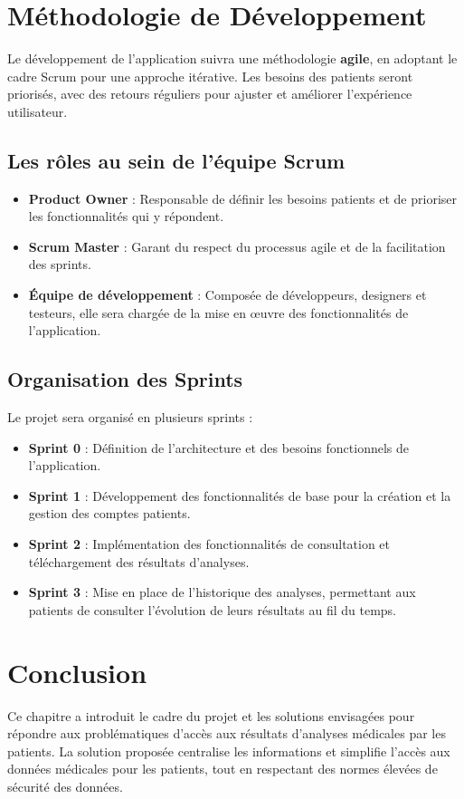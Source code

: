 \documentclass[12pt,a4paper]{report}
\begin{document}
\section{Méthodologie de Développement}
Le développement de l'application suivra une méthodologie \textbf{agile}, en adoptant le cadre Scrum pour une approche itérative. Les besoins des patients seront priorisés, avec des retours réguliers pour ajuster et améliorer l'expérience utilisateur.

\subsection{Les rôles au sein de l'équipe Scrum}
\begin{itemize}
    \item \textbf{Product Owner} : Responsable de définir les besoins patients et de prioriser les fonctionnalités qui y répondent.
    \item \textbf{Scrum Master} : Garant du respect du processus agile et de la facilitation des sprints.
    \item \textbf{Équipe de développement} : Composée de développeurs, designers et testeurs, elle sera chargée de la mise en œuvre des fonctionnalités de l'application.
\end{itemize}

\subsection{Organisation des Sprints}
Le projet sera organisé en plusieurs sprints :

\begin{itemize}
    \item \textbf{Sprint 0} : Définition de l'architecture et des besoins fonctionnels de l'application.
    \item \textbf{Sprint 1} : Développement des fonctionnalités de base pour la création et la gestion des comptes patients.
    \item \textbf{Sprint 2} : Implémentation des fonctionnalités de consultation et téléchargement des résultats d'analyses.
    \item \textbf{Sprint 3} : Mise en place de l'historique des analyses, permettant aux patients de consulter l'évolution de leurs résultats au fil du temps.
\end{itemize}

\section{Conclusion}
Ce chapitre a introduit le cadre du projet et les solutions envisagées pour répondre aux problématiques d'accès aux résultats d'analyses médicales par les patients. La solution proposée centralise les informations et simplifie l'accès aux données médicales pour les patients, tout en respectant des normes élevées de sécurité des données.
\end{document}
